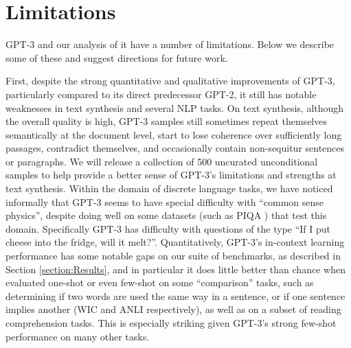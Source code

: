 \section{Limitations}
\label{section:Limitations}

GPT-3 and our analysis of it have a number of limitations.  Below we describe some of these and suggest directions for future work.

First, despite the strong quantitative and qualitative improvements of GPT-3, particularly compared to its direct predecessor GPT-2, it still has notable weaknesses in text synthesis and several NLP tasks.  On text synthesis, although the overall quality is high, GPT-3 samples still sometimes repeat themselves semantically at the document level, start to lose coherence over sufficiently long passages, contradict themselves, and occasionally contain non-sequitur sentences or paragraphs.  We will release a collection of 500 uncurated unconditional samples to help provide a better sense of GPT-3’s limitations and strengths at text synthesis. Within the domain of discrete language tasks, we have noticed informally that GPT-3 seems to have special difficulty with ``common sense physics'', despite doing well on some datasets (such as PIQA \cite{bisk2019piqa}) that test this domain.  Specifically GPT-3 has difficulty with questions of the type ``If I put cheese into the fridge, will it melt?''.  Quantitatively, GPT-3’s in-context learning performance has some notable gaps on our suite of benchmarks, as described in Section \ref{section:Results}, and in particular it does little better than chance when evaluated one-shot or even few-shot on some ``comparison'' tasks, such as determining if two words are used the same way in a sentence, or if one sentence implies another (WIC and ANLI respectively), as well as on a subset of reading comprehension tasks.  This is especially striking given GPT-3’s strong few-shot performance on many other tasks.

